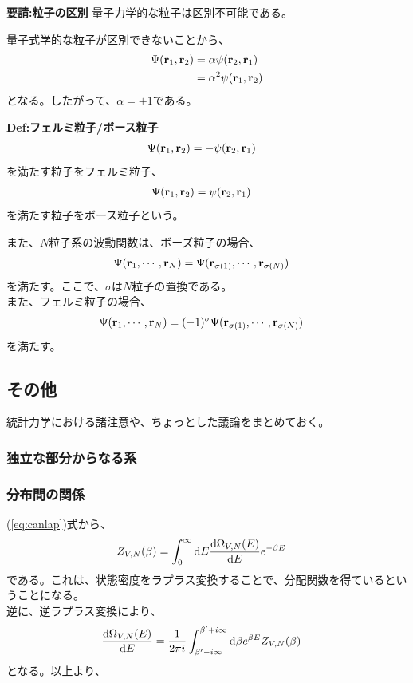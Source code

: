 \documentclass[a4paper,11pt]{jsarticle}
\numberwithin{equation}{section}
\begin{document}
\begin{itembox}[l]{\textbf{要請:粒子の区別}}
  量子力学的な粒子は区別不可能である。

\end{itembox}
量子式学的な粒子が区別できないことから、
\begin{align}
  \Psi(\vb{r}_1,\vb{r}_2) &= \alpha \psi(\vb{r}_2,\vb{r}_1)\\
  &= \alpha^2 \psi(\vb{r}_1,\vb{r}_2)
\end{align}
となる。したがって、$\alpha = \pm 1$である。\\
\begin{itembox}[l]{\textbf{Def:フェルミ粒子/ボース粒子}}
  \begin{align}
    \Psi(\vb{r}_1,\vb{r}_2) &= -\psi(\vb{r}_2,\vb{r}_1)
  \end{align}
  を満たす粒子をフェルミ粒子、
  \begin{align}
    \Psi(\vb{r}_1,\vb{r}_2) &= \psi(\vb{r}_2,\vb{r}_1)
  \end{align}
  を満たす粒子をボース粒子という。

\end{itembox}
また、$N$粒子系の波動関数は、ボーズ粒子の場合、
\begin{align}
  \Psi(\vb{r}_1,\cdots,\vb{r}_N) &= \Psi(\vb{r}_{\sigma(1)},\cdots,\vb{r}_{\sigma(N)})
\end{align}
を満たす。ここで、$\sigma$は$N$粒子の置換である。\\
また、フェルミ粒子の場合、
\begin{align}
  \Psi(\vb{r}_1,\cdots,\vb{r}_N) &= (-1)^{\sigma}\Psi(\vb{r}_{\sigma(1)},\cdots,\vb{r}_{\sigma(N)})
\end{align}
を満たす。\\




\subsection{その他}
統計力学における諸注意や、ちょっとした議論をまとめておく。\\

\subsubsection{独立な部分からなる系}

\subsubsection{分布間の関係}
(\ref{eq:canlap})式から、
\begin{align}
  Z_{V,N}(\beta) &= \int_{0}^{\infty}\dd E \dv{\Omega_{V,N}(E)}{E}e^{-\beta E}
\end{align}
である。これは、状態密度をラプラス変換することで、分配関数を得ているということになる。\\
逆に、逆ラプラス変換により、
\begin{align}
  \dv{\Omega_{V,N}(E)}{E} &= \frac{1}{2\pi i}\int_{\beta' - i\infty}^{\beta' + i\infty}\dd \beta e^{\beta E}Z_{V,N}(\beta)
\end{align}
となる。以上より、
\end{document}
